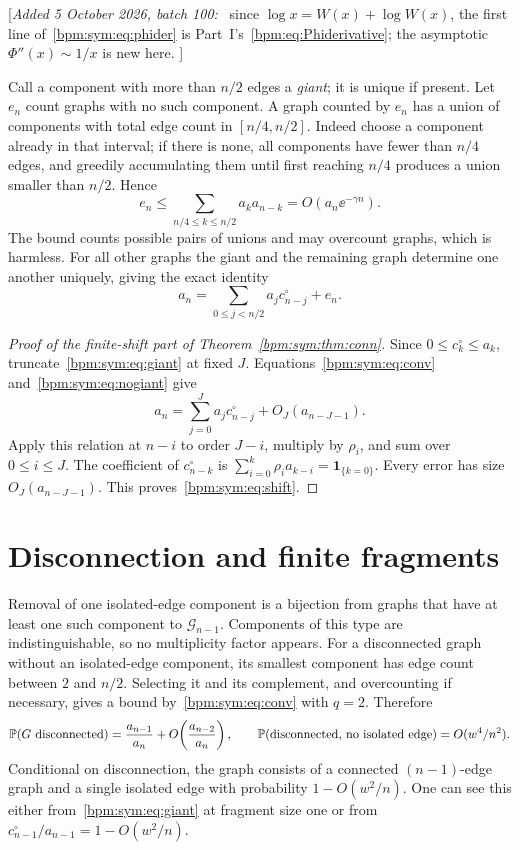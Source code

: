 \documentclass[11pt,a4paper]{article}
\theoremstyle{remark}\newtheorem{remark}[theorem]{Remark}%
\newenvironment{writenote}{\par\smallskip\noindent\small[\textit{Added 5 October 2026, batch 100:}\ }{]\par\smallskip}
\begin{document}
\begin{writenote}
since $\log x=W(x)+\log W(x)$, the first line of~\eqref{bpm:sym:eq:phider}
is Part~I's~\eqref{bpm:eq:Phiderivative}; the asymptotic $\Phi''(x)\sim1/x$
is new here.
\end{writenote}

Call a component with more than $n/2$ edges a \emph{giant}; it is unique if present. Let $e_n$ count graphs with no such component. A graph counted by $e_n$ has a union of components with total edge count in $[n/4,n/2]$. Indeed choose a component already in that interval; if there is none, all components have fewer than $n/4$ edges, and greedily accumulating them until first reaching $n/4$ produces a union smaller than $n/2$. Hence
\begin{equation}\label{bpm:sym:eq:nogiant}
 e_n\le\sum_{n/4\le k\le n/2}a_k a_{n-k}
       =O(a_n\ee^{-\gamma n}).
\end{equation}
The bound counts possible pairs of unions and may overcount graphs, which is harmless. For all other graphs the giant and the remaining graph determine one another uniquely, giving the exact identity
\begin{equation}\label{bpm:sym:eq:giant}
 a_n=\sum_{0\le j<n/2}a_j c^\circ_{n-j}+e_n.
\end{equation}

\begin{proof}[Proof of the finite-shift part of Theorem~\ref{bpm:sym:thm:conn}]
Since $0\le c^\circ_k\le a_k$, truncate~\eqref{bpm:sym:eq:giant} at fixed $J$. Equations~\eqref{bpm:sym:eq:conv} and~\eqref{bpm:sym:eq:nogiant} give
\[
 a_n=\sum_{j=0}^J a_j c^\circ_{n-j}+O_J(a_{n-J-1}).
\]
Apply this relation at $n-i$ to order $J-i$, multiply by $\rho_i$, and sum over $0\le i\le J$. The coefficient of $c^\circ_{n-k}$ is $\sum_{i=0}^k \rho_i a_{k-i}=\mathbf1_{\{k=0\}}$. Every error has size $O_J(a_{n-J-1})$. This proves~\eqref{bpm:sym:eq:shift}.
\end{proof}

\section{Disconnection and finite fragments}
Removal of one isolated-edge component is a bijection from graphs that have at least one such component to $\mathcal G_{n-1}$. Components of this type are indistinguishable, so no multiplicity factor appears. For a disconnected graph without an isolated-edge component, its smallest component has edge count between $2$ and $n/2$. Selecting it and its complement, and overcounting if necessary, gives a bound by~\eqref{bpm:sym:eq:conv} with $q=2$. Therefore
\begin{equation}\label{bpm:sym:eq:isolatededge}
 \mathbb P(G\text{ disconnected})=\frac{a_{n-1}}{a_n}
     +O\!\left(\frac{a_{n-2}}{a_n}\right),\qquad
 \mathbb P(\text{disconnected, no isolated edge})=O(w^4/n^2).
\end{equation}
Conditional on disconnection, the graph consists of a connected $(n-1)$-edge graph and a single isolated edge with probability $1-O(w^2/n)$. One can see this either from~\eqref{bpm:sym:eq:giant} at fragment size one or from $c^\circ_{n-1}/a_{n-1}=1-O(w^2/n)$.
\end{document}
